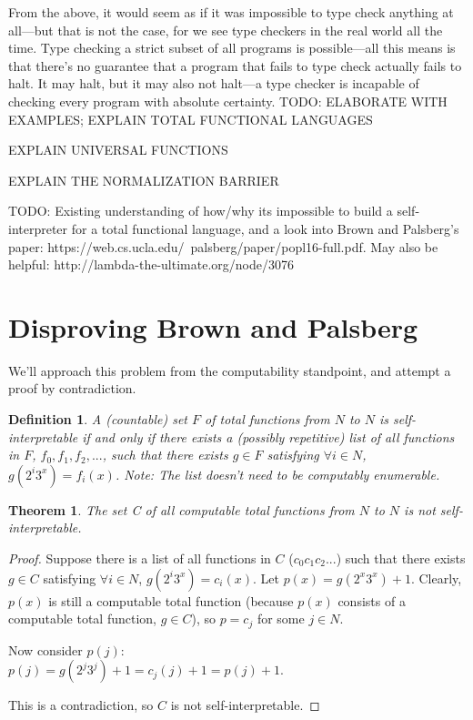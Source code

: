 \documentclass{article}
\newtheorem{theorem}{Theorem}
\newtheorem{definition}{Definition}
\begin{document}
From the above, it would seem as if it was impossible to type check anything at all—but that is not the case, for we see type checkers in the real world all the time. Type checking a strict subset of all programs is possible—all this means is that there's no guarantee that a program that fails to type check actually fails to halt. It may halt, but it may also not halt—a type checker is incapable of checking every program with absolute certainty. TODO: ELABORATE WITH EXAMPLES; EXPLAIN TOTAL FUNCTIONAL LANGUAGES

EXPLAIN UNIVERSAL FUNCTIONS

EXPLAIN THE NORMALIZATION BARRIER

TODO: Existing understanding of how/why its impossible to build a self-interpreter for a total functional language, and a look into Brown and Palsberg's paper: https://web.cs.ucla.edu/~palsberg/paper/popl16-full.pdf. May also be helpful: http://lambda-the-ultimate.org/node/3076

\section{Disproving Brown and Palsberg}

We'll approach this problem from the computability standpoint, and attempt a proof by contradiction.

\begin{definition}
A (countable) set $F$ of total functions from $N$ to $N$ is self-interpretable if and only if there exists a (possibly repetitive) list of all functions in $F$, $f_0, f_1, f_2,  ...$, such that there exists $g \in F$ satisfying $\forall i \in N$, $g(2^i3^x) = f_i(x)$.
Note: The list doesn’t need to be computably enumerable.
\end{definition}

\begin{theorem}
The set C of all computable total functions from $N$ to $N$ is not self-interpretable.
\end{theorem}

\begin{proof}
Suppose there is a list of all functions in $C$ ($c_0  c_1  c_2  ...$) such that there exists $g \in C$ satisfying  $\forall i \in N$, $g(2^i3^x)=c_i(x)$. Let $p(x) = g(2^x3^x) + 1$. Clearly, $p(x)$ is still a computable total function (because $p(x)$ consists of a computable total function, $g \in C$), so $p = c_j$ for some $j \in N$.

Now consider $p(j)$:\\
$p(j) = g(2^j3^j) + 1 = c_j(j) + 1 = p(j) + 1$.

This is a contradiction, so $C$ is not self-interpretable.
\end{proof}
\end{document}
